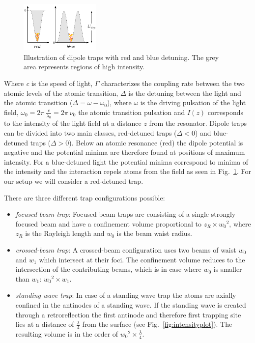 \begin{figure}
    \centering
    \includegraphics[width=0.35\textwidth]{redbluedetuning}    
    \caption{\label{fig:redbluedetuning} Illustration of dipole traps with red 
    and blue detuning. The grey area represents regions of high intensity.}
\end{figure}
Where \textit{c} is the speed of light, \(\Gamma \) characterizes the coupling 
rate between the two atomic levels of the atomic transition, \(\Delta \) is the 
detuning between the light and the atomic transition 
(\(\Delta = \omega - \omega_0 \)), where \(\omega \) is the driving pulsation of 
the light field, \(\omega_0 = 2\pi~\frac{c}{\lambda_0}=2\pi~\nu_0 \) the atomic 
transition pulsation and \(I(z) \) corresponds to the intensity of the light field 
at a distance \(z\) from the resonator. Dipole traps can be divided into two main 
classes, red-detuned traps (\(\Delta < 0 \)) and blue-detuned traps (\(\Delta > 0 \)). 
Below an atomic resonance (red) the dipole potential is negative and the potential 
minima are therefore found at positions of maximum intensity. For a blue-detuned 
light the potential minima correspond to minima of the intensity and the interaction 
repels atoms from the field as seen in Fig.~\ref{fig:redbluedetuning}. For our 
setup we will consider a red-detuned trap.
\pagebreak

There are three different trap configurations possible:
\begin{itemize}
    \setlength{\itemsep}{0ex}
    \item \textit{focused-beam trap}: Focused-beam traps are consisting of a 
    single strongly focused beam and have a confinement volume proportional to 
    \(z_R \times {w_0}^2 \), where \(z_R \) is the Rayleigh length and \(w_0 \) 
    is the beam waist radius.
    \item \textit{crossed-beam trap}: A crossed-beam configuration uses two beams
    of waist \(w_0\) and \(w_1\) which intersect at their foci. The confinement 
    volume reduces to the intersection of the contributing beams, which is in 
    case where \(w_0 \) is smaller than \(w_1 \): \({w_0}^2\times w_1\).
    \item \textit{standing wave trap}: In case of a standing wave trap the atoms 
    are axially confined in the antinodes of a standing wave. If the standing 
    wave is created through a retroreflection the first antinode and therefore 
    first trapping site lies at a distance of \(\frac{\lambda}{4} \) from the 
    surface (see Fig.~\ref{fig:intensityplot}). The resulting volume is in the 
    order of \({w_0}^2 \times \frac{\lambda}{4} \).
\end{itemize} 

